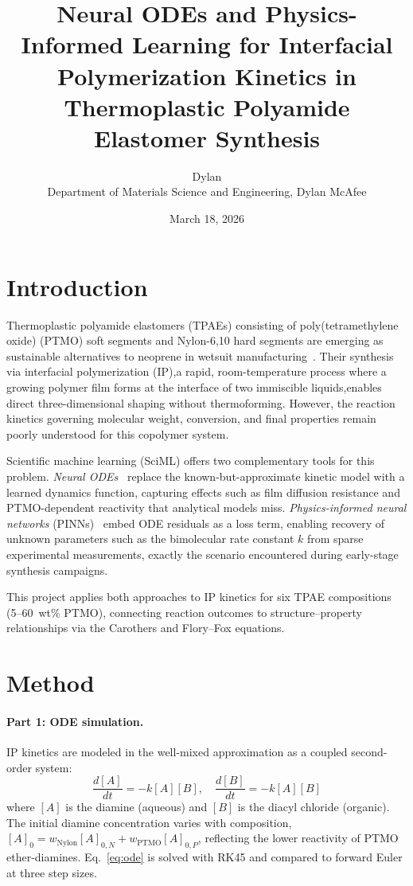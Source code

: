 \documentclass[10pt,twocolumn]{article}
\title{\textbf{Neural ODEs and Physics-Informed Learning for Interfacial
Polymerization Kinetics in Thermoplastic Polyamide Elastomer Synthesis}}
\author{Dylan\\
\small Department of Materials Science and Engineering, Dylan McAfee}
\date{March 18, 2026}
\begin{document}
\maketitle

\section*{Introduction}

Thermoplastic polyamide elastomers (TPAEs) consisting of poly(tetramethylene
oxide) (PTMO) soft segments and Nylon-6,10 hard segments are emerging as
sustainable alternatives to neoprene in wetsuit manufacturing~\cite{gong2021}.
Their synthesis via interfacial polymerization (IP),a rapid, room-temperature
process where a growing polymer film forms at the interface of two immiscible
liquids,enables direct three-dimensional shaping without thermoforming.
However, the reaction kinetics governing molecular weight, conversion, and final
properties remain poorly understood for this copolymer system.

Scientific machine learning (SciML) offers two complementary tools for this
problem. \textit{Neural ODEs}~\cite{chen2018} replace the known-but-approximate
kinetic model with a learned dynamics function, capturing effects such as film
diffusion resistance and PTMO-dependent reactivity that analytical models miss.
\textit{Physics-informed neural networks} (PINNs)~\cite{raissi2019} embed ODE
residuals as a loss term, enabling recovery of unknown parameters such as the
bimolecular rate constant $k$ from sparse experimental measurements, exactly
the scenario encountered during early-stage synthesis campaigns.

This project applies both approaches to IP kinetics for six TPAE compositions
(5--60~wt\% PTMO), connecting reaction outcomes to structure--property
relationships via the Carothers and Flory--Fox equations.

\section*{Method}

\paragraph{Part 1: ODE simulation.}
IP kinetics are modeled in the well-mixed approximation as a coupled second-order
system:
\begin{equation}
  \frac{d[A]}{dt} = -k[A][B], \quad \frac{d[B]}{dt} = -k[A][B]
  \label{eq:ode}
\end{equation}
where $[A]$ is the diamine (aqueous) and $[B]$ is the diacyl chloride (organic).
The initial diamine concentration varies with composition,
$[A]_0 = w_\text{Nylon}[A]_{0,N} + w_\text{PTMO}[A]_{0,P}$, reflecting the
lower reactivity of PTMO ether-diamines. Eq.~\eqref{eq:ode} is solved with
RK45 and compared to forward Euler at three step sizes.
\end{document}
